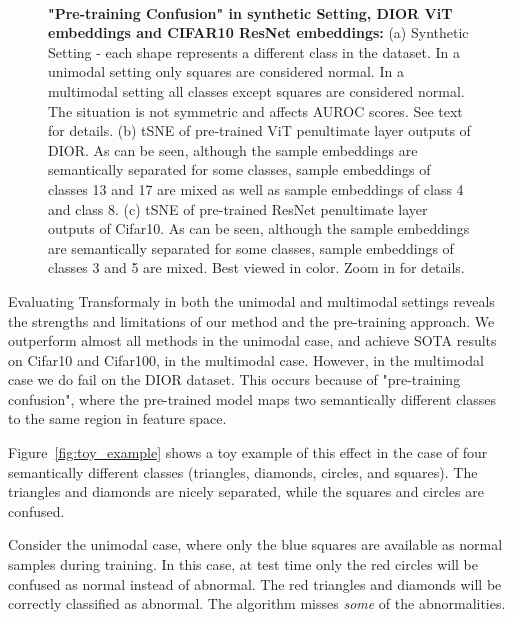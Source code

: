 \documentclass[10pt,twocolumn,letterpaper]{article}
\begin{document}
\begin{figure*}[ht!]
\hspace{\fill}
\hspace{\fill}
   \\
\caption{{\bf"Pre-training Confusion" in synthetic Setting, DIOR ViT embeddings and CIFAR10 ResNet embeddings:} (a) Synthetic Setting - each shape represents a different class in the dataset. In a unimodal setting only squares are considered normal. In a multimodal setting all classes except squares are considered normal. The situation is not symmetric and affects AUROC scores. See text for details. (b) tSNE of pre-trained ViT penultimate layer outputs of DIOR. As can be seen, although the sample embeddings are semantically separated for some classes, sample embeddings of classes 13 and 17 are mixed as well as sample embeddings of class 4 and class 8. (c) tSNE of pre-trained ResNet penultimate layer outputs of Cifar10. As can be seen, although the sample embeddings are semantically separated for some classes, sample embeddings of classes 3 and 5 are mixed. Best viewed in color. Zoom in for details. }
    \label{pretriaining_confusion}
\end{figure*}


Evaluating Transformaly in both the unimodal and multimodal settings reveals the strengths and limitations of our method and the pre-training approach. We outperform almost all methods in the unimodal case, and achieve SOTA results on Cifar10 and Cifar100, in the multimodal case. However, in the multimodal case we do fail on the DIOR dataset. This occurs because of "pre-training confusion", where the pre-trained model maps two semantically different classes to the same region in feature space.

Figure~\ref{fig:toy_example} shows a toy example of this effect in the case of four semantically different classes (triangles, diamonds, circles, and squares). The triangles and diamonds are nicely separated, while the squares and circles are confused. 

Consider the unimodal case, where only the blue squares are available as normal samples during training. In this case, at test time only the red circles will be confused as normal instead of abnormal. The red triangles and diamonds will be correctly classified as abnormal. The algorithm misses {\em some} of the abnormalities.
\end{document}

